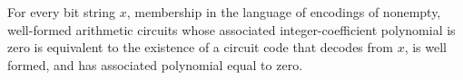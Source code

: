 \begin{theorem}
\label{Randomized.mem_ZEROP_iff}
\leanok
{}
For every bit string $x$, membership in the language of encodings of nonempty,
well-formed arithmetic circuits whose associated integer-coefficient polynomial is zero
is equivalent to the existence of a circuit code that decodes from $x$, is well formed,
and has associated polynomial equal to zero.
\end{theorem}

